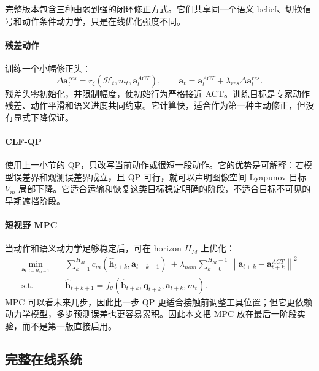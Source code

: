 \documentclass[UTF8,a4paper,11pt]{ctexart}
\newcommand{\norm}[1]{\left\lVert #1 \right\rVert}
\begin{document}
完整版本包含三种由弱到强的闭环修正方式。它们共享同一个语义 belief、切换信号和动作条件动力学，只是在线优化强度不同。

\paragraph{残差动作}
训练一个小幅修正头：
\begin{equation}
\Delta\bm a_t^{res}=r_\xi(\mathcal H_t,m_t,\bm a_t^{ACT}),\qquad
\bm a_t=\bm a_t^{ACT}+\lambda_{res}\Delta\bm a_t^{res}.
\end{equation}
残差头零初始化，并限制幅度，使初始行为严格接近 ACT。训练目标是专家动作残差、动作平滑和语义进度共同约束。它计算快，适合作为第一种主动修正，但没有显式下降保证。

\paragraph{CLF-QP}
使用上一小节的 QP，只改写当前动作或很短一段动作。它的优势是可解释：若模型误差界和观测误差界成立，且 QP 可行，就可以声明图像空间 Lyapunov 目标 $V_m$ 局部下降。它适合运输和恢复这类目标稳定明确的阶段，不适合目标不可见的早期遮挡阶段。

\paragraph{短视野 MPC}
当动作和语义动力学足够稳定后，可在 horizon $H_M$ 上优化：
\begin{align}
\min_{\bm a_{t:t+H_M-1}}\quad
&\sum_{k=1}^{H_M} c_m(\hat{\bm h}_{t+k},\bm a_{t+k-1})
\ +\lambda_{nom}\sum_{k=0}^{H_M-1}
\norm{\bm a_{t+k}-\bm a_{t+k}^{ACT}}^2\\
\text{s.t.}\quad
&\hat{\bm h}_{t+k+1}=f_\theta(\hat{\bm h}_{t+k},\bm q_{t+k},\bm a_{t+k},m_t).
\end{align}
MPC 可以看未来几步，因此比一步 QP 更适合接触前调整工具位置；但它更依赖动力学模型，多步预测误差也更容易累积。因此本文把 MPC 放在最后一阶段实验，而不是第一版直接启用。

\subsection{完整在线系统}
\end{document}
